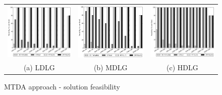 \begin{figure}
\begin{tabular}{ccc}
\includegraphics[width=.30\linewidth,keepaspectratio]{figs/feasibility_cvs_oarb_ld_mtd.png} &
\includegraphics[width=.30\linewidth,keepaspectratio]{figs/feasibility_cvs_oarb_md_mtd.png} &
\includegraphics[width=.30\linewidth,keepaspectratio]{figs/feasibility_cvs_oarb_hd_mtd.png} \\
(a) LDLG & (b) MDLG & (c) HDLG
\end{tabular}
\caption{MTDA approach - solution feasibility}
\label{fig:mtd_deviate}
\end{figure}


